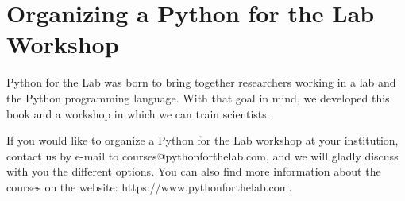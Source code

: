 \section{Organizing a Python for the Lab Workshop}\label{sec:organizing-a-python-for-the-lab-workshop}
Python for the Lab was born to bring together researchers working in a lab and the Python programming language. With that goal in mind, we developed this book and a workshop in which we can train scientists. 

\sloppy If you would like to organize a Python for the Lab workshop at your institution, contact us by e-mail to {courses@pythonforthelab.com}, and we will gladly discuss with you the different options. You can also find more information about the courses on the website: {https://www.pythonforthelab.com}.
